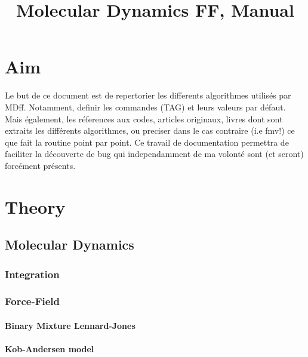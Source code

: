 \documentclass[a4paper,8pt]{article}
\title{Molecular Dynamics FF, Manual }
\newcommand{\MDFF}{{\sc MDff}}
\newcommand{\FMV}{{\sc fmv}}
\begin{document}
\changepage{0pt}{30pt}{0pt}{0pt}{0pt}{0pt}{0pt}{0pt}{0pt}
\maketitle
\clearpage
\tableofcontents

\clearpage

\section{Aim}

Le but de ce document est de repertorier les differents 
algorithmes utilis\'es par \MDFF. Notamment, definir les 
commandes (TAG) et leurs valeurs par défaut. Mais également, 
les r\'eferences aux codes, articles originaux, livres dont 
sont extraits les diff\'erents algorithmes, ou preciser dans 
le cas contraire (i.e \FMV!) ce que fait la routine point par point. 
Ce travail de documentation permettra de faciliter la d\'ecouverte
de bug qui independamment de ma volont\'e sont (et seront) 
forc\'ement pr\'esents. 

\clearpage

\section{Theory}

\subsection{Molecular Dynamics\label{sec:MD}}
\subsubsection{Integration\label{sec:integrator}}
\subsubsection{Force-Field}
\paragraph{Binary Mixture Lennard-Jones\label{sec:BMLJ}}
\paragraph{Kob-Andersen model\label{sec:KA}}
\end{document}
